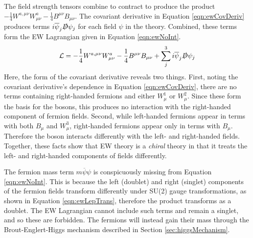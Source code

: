 The field strength tensors combine to contract to produce the product $-\frac{1}{4}W^{a,\mu\nu}W^{a}_{\mu\nu}-\frac{1}{4}B^{\mu\nu}B_{\mu\nu}$.
The covariant derivative in Equation \ref{eqn:ewCovDeriv} produces terms $i\overline{\psi}_j\slashed{D}\psi_j$ for each field $\psi$ in the theory.
Combined, these terms form the EW Lagrangian given in Equation \ref{eqn:ewNoInt}.
\begin{equation}\begin{split}\label{eqn:ewNoInt}
\mathcal{L} = -\frac{1}{4}W^{a,\mu\nu}W^{a}_{\mu\nu}- \frac{1}{4}B^{\mu\nu}B_{\mu\nu}+ \sum_j^3 i\overline{\psi}_j\slashed{D}\psi_j
\end{split}\end{equation}
Here, the form of the covariant derivative reveals two things.
First, noting the covariant derivative's dependence in Equation \ref{eqn:ewCovDeriv}, there are no terms containing right-handed fermions and either $W^1_\mu$ or $W^2_\mu$. Since these form the basis for the \W bosons, this produces no interaction with the right-handed component of fermion fields.
Second, while left-handed fermions appear in terms with both $B_\mu$ and $W^3_\mu$, right-handed fermions appear only in terms with $B_\mu$. Therefore the \Z boson interacts differently with the left- and right-handed fields.
Together, these facts show that EW theory is a \emph{chiral} theory in that it treats the left- and right-handed components of fields differently.

The fermion mass term $m\overline{\psi}\psi$ is conspicuously missing from Equation \ref{eqn:ewNoInt}.
This is because the left (doublet) and right (singlet) components of the fermion fields transform differently under SU(2) gauge transformations, as shown in Equation \ref{eqn:ewLepTrans}, therefore the product transforms as a doublet.
The EW Lagrangian cannot include such terms and remain a singlet, and so these are forbidden.
The fermions will instead gain their mass through the Brout-Englert-Higgs mechanism described in Section \ref{sec:higgsMechanism}.

